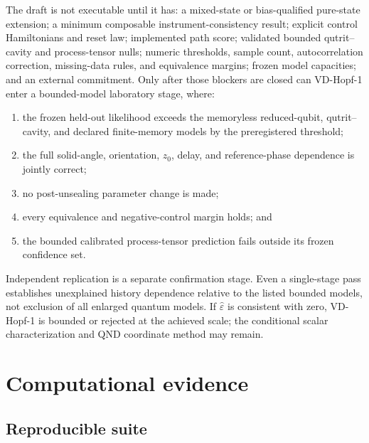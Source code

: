 \documentclass[10pt]{article}
\theoremstyle{definition}
\theoremstyle{remark}
\begin{document}
The draft is not executable until it has: a mixed-state or bias-qualified pure-state extension; a minimum composable instrument-consistency result; explicit control Hamiltonians and reset law; implemented path score; validated bounded qutrit--cavity and process-tensor nulls; numeric thresholds, sample count, autocorrelation correction, missing-data rules, and equivalence margins; frozen model capacities; and an external commitment. Only after those blockers are closed can VD-Hopf-1 enter a bounded-model laboratory stage, where:
\begin{enumerate}
\item the frozen held-out likelihood exceeds the memoryless reduced-qubit, qutrit--cavity, and declared finite-memory models by the preregistered threshold;
\item the full solid-angle, orientation, \(z_0\), delay, and reference-phase dependence is jointly correct;
\item no post-unsealing parameter change is made;
\item every equivalence and negative-control margin holds; and
\item the bounded calibrated process-tensor prediction fails outside its frozen confidence set.
\end{enumerate}
Independent replication is a separate confirmation stage. Even a single-stage pass establishes unexplained history dependence relative to the listed bounded models, not exclusion of all enlarged quantum models. If \(\widehat\varepsilon\) is consistent with zero, VD-Hopf-1 is bounded or rejected at the achieved scale; the conditional scalar characterization and QND coordinate method may remain.

\section{Computational evidence}

\subsection{Reproducible suite}
\end{document}
